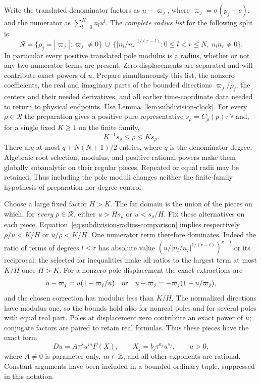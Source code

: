 Write the translated denominator factors as $u-\varpi_j$, where
$\varpi_j=\sigma(p_j-c)$, and the numerator as $\sum_{l=0}^{N}n_lu^l$.
The \emph{complete radius list} for the following split is
\begin{equation}
\label{eq:subdivision-complete-radii}
 \mathcal R=
 \{\rho_j=|\varpi_j|:\varpi_j\ne0\}
 \ \cup\ 
 \{|n_l/n_r|^{1/(r-l)}:0\le l<r\le N,\ n_ln_r\ne0\}.
\end{equation}
In particular every positive translated pole modulus is a radius,
whether or not any two numerator terms are present.  Zero displacements
are separated and will contribute exact powers of $u$.
Prepare simultaneously this list, the nonzero coefficients, the real
and imaginary parts of the bounded directions $\varpi_j/\rho_j$, the
centers and their needed derivatives, and all earlier time-coordinate
data needed to return to physical endpoints.  Use
Lemma~\ref{lem:subdivision-clock}.  For every $\rho\in\mathcal R$
the preparation gives a positive pure representative
$s_\rho=C_\rho(p)\tau^{\gamma_\rho}$ and, for a single fixed $K\ge1$
on the finite family,
\begin{equation}
\label{eq:subdivision-radius-comparison}
 K^{-1}s_\rho\le\rho\le Ks_\rho.
\end{equation}
There are at most $q+N(N+1)/2$ entries, where $q$ is the denominator
degree.  Algebraic root selection, modulus, and positive rational
powers make them globally subanalytic on their regular pieces.  Repeated
or equal radii may be retained.  Thus including the pole moduli changes
neither the finite-family hypothesis of preparation nor degree control.

Choose a large fixed factor $H>K$.  The far domain is the union of the
pieces on which, for \emph{every} $\rho\in\mathcal R$, either
$u>Hs_\rho$ or $u<s_\rho/H$.  Fix these alternatives on each piece.
Equation~\eqref{eq:subdivision-radius-comparison} implies respectively
$\rho/u<K/H$ or $u/\rho<K/H$.  One numerator term therefore
dominates.  Indeed the ratio
of terms of degrees $l<r$ has absolute value
$(u/|n_l/n_r|^{1/(r-l)})^{r-l}$ or its reciprocal; the selected far
inequalities make all ratios to the largest term at most $K/H$ once
$H>K$.  For a nonzero pole displacement the exact extractions are
\[
 u-\varpi_j=u(1-\varpi_j/u)
 \quad\hbox{or}\quad
 u-\varpi_j=-\varpi_j(1-u/\varpi_j),
\]
and the chosen correction has modulus less than $K/H$.
The normalized directions have modulus one, so the bounds hold also
for nonreal poles and for several poles with equal real part.  Poles
at displacement zero contribute an exact power of $u$; conjugate
factors are paired to retain real formulas.
Thus these pieces have the exact form
\begin{equation}
\label{eq:subdivision-annulus}
 Du=A\tau^\lambda u^m F(X),\qquad
 X_j=b_j\tau^{a_j}u^{s_j},\qquad u>0,
\end{equation}
where $A\ne0$ is parameter-only, $m\in\mathbb{Z}$, and all other exponents
are rational.  Constant arguments have been included in a bounded
ordinary tuple, suppressed in this notation.


